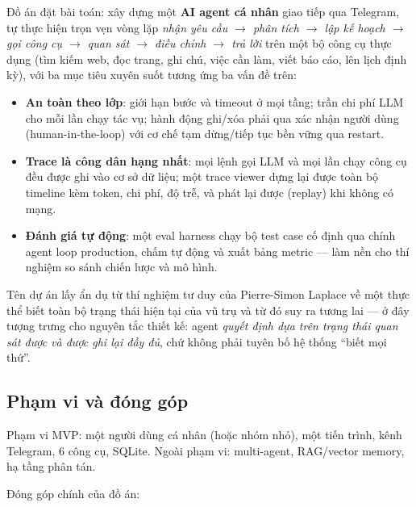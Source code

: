 Đồ án đặt bài toán: xây dựng một \textbf{AI agent cá nhân} giao tiếp qua
Telegram, tự thực hiện trọn vẹn vòng lặp \emph{nhận yêu cầu $\to$ phân tích
$\to$ lập kế hoạch $\to$ gọi công cụ $\to$ quan sát $\to$ điều chỉnh $\to$ trả
lời} trên một bộ công cụ thực dụng (tìm kiếm web, đọc trang, ghi chú, việc cần
làm, viết báo cáo, lên lịch định kỳ), với ba mục tiêu xuyên suốt tương ứng ba
vấn đề trên:

\begin{itemize}
  \item \textbf{An toàn theo lớp}: giới hạn bước và timeout ở mọi tầng; trần
        chi phí LLM cho mỗi lần chạy tác vụ; hành động ghi/xóa phải qua xác
        nhận người dùng (human-in-the-loop) với cơ chế tạm dừng/tiếp tục bền
        vững qua restart.
  \item \textbf{Trace là công dân hạng nhất}: mọi lệnh gọi LLM và mọi lần chạy
        công cụ đều được ghi vào cơ sở dữ liệu; một trace viewer dựng lại được
        toàn bộ timeline kèm token, chi phí, độ trễ, và phát lại được
        (replay) khi không có mạng.
  \item \textbf{Đánh giá tự động}: một eval harness chạy bộ test case cố định
        qua chính agent loop production, chấm tự động và xuất bảng metric ---
        làm nền cho thí nghiệm so sánh chiến lược và mô hình.
\end{itemize}

Tên dự án lấy ẩn dụ từ thí nghiệm tư duy của Pierre-Simon Laplace về một thực
thể biết toàn bộ trạng thái hiện tại của vũ trụ và từ đó suy ra tương lai ---
ở đây tượng trưng cho nguyên tắc thiết kế: agent \emph{quyết định dựa trên
trạng thái quan sát được và được ghi lại đầy đủ}, chứ không phải tuyên bố hệ
thống ``biết mọi thứ''.

\subsection{Phạm vi và đóng góp}

Phạm vi MVP: một người dùng cá nhân (hoặc nhóm nhỏ), một tiến trình, kênh
Telegram, 6 công cụ, SQLite. Ngoài phạm vi: multi-agent, RAG/vector memory,
hạ tầng phân tán.

Đóng góp chính của đồ án:

